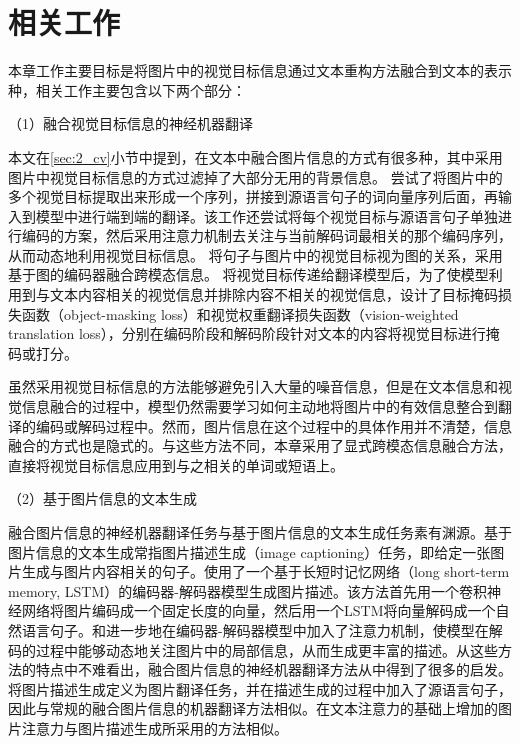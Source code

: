 \section{相关工作}



% 

本章工作主要目标是将图片中的视觉目标信息通过文本重构方法融合到文本的表示种，相关工作主要包含以下两个部分：

{\sffamily （1）融合视觉目标信息的神经机器翻译}

本文在\ref{sec:2_cv}小节中提到，在文本中融合图片信息的方式有很多种，其中采用图片中视觉目标信息的方式过滤掉了大部分无用的背景信息。
尝试了将图片中的多个视觉目标提取出来形成一个序列，拼接到源语言句子的词向量序列后面，再输入到模型中进行端到端的翻译。该工作还尝试将每个视觉目标与源语言句子单独进行编码的方案，然后采用注意力机制去关注与当前解码词最相关的那个编码序列，从而动态地利用视觉目标信息。
将句子与图片中的视觉目标视为图的关系，采用基于图的编码器融合跨模态信息。
将视觉目标传递给翻译模型后，为了使模型利用到与文本内容相关的视觉信息并排除内容不相关的视觉信息，设计了目标掩码损失函数（object-masking loss）和视觉权重翻译损失函数（vision-weighted translation loss），分别在编码阶段和解码阶段针对文本的内容将视觉目标进行掩码或打分。

虽然采用视觉目标信息的方法能够避免引入大量的噪音信息，但是在文本信息和视觉信息融合的过程中，模型仍然需要学习如何主动地将图片中的有效信息整合到翻译的编码或解码过程中。然而，图片信息在这个过程中的具体作用并不清楚，信息融合的方式也是隐式的。与这些方法不同，本章采用了显式跨模态信息融合方法，直接将视觉目标信息应用到与之相关的单词或短语上。

{\sffamily （2）基于图片信息的文本生成}

融合图片信息的神经机器翻译任务与基于图片信息的文本生成任务素有渊源。基于图片信息的文本生成常指图片描述生成（image captioning）任务，即给定一张图片生成与图片内容相关的句子。使用了一个基于长短时记忆网络（long short-term memory, LSTM）的编码器-解码器模型生成图片描述。该方法首先用一个卷积神经网络将图片编码成一个固定长度的向量，然后用一个LSTM将向量解码成一个自然语言句子。和进一步地在编码器-解码器模型中加入了注意力机制，使模型在解码的过程中能够动态地关注图片中的局部信息，从而生成更丰富的描述。从这些方法的特点中不难看出，融合图片信息的神经机器翻译方法从中得到了很多的启发。将图片描述生成定义为图片翻译任务，并在描述生成的过程中加入了源语言句子，因此与常规的融合图片信息的机器翻译方法相似。在文本注意力的基础上增加的图片注意力与图片描述生成所采用的方法相似。

